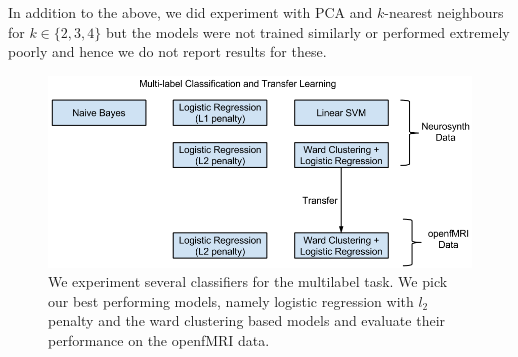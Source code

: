 \documentclass{article} %
\begin{document}
In addition to the above, we did experiment with PCA and $k$-nearest neighbours for $k \in \{2,3,4\}$ but the models were not trained similarly or performed extremely poorly and hence we do not report results for these.
\begin{figure}[ht]
\vspace{-0.5cm}
\centering
\includegraphics[scale=0.5]{./figs/multilabel_transfer.png}
\caption{We experiment several classifiers for the multilabel task. We pick our best performing models, namely logistic regression with $l_2$ penalty and the ward clustering based models and evaluate their performance on the openfMRI data. }
\end{figure}
\end{document}

